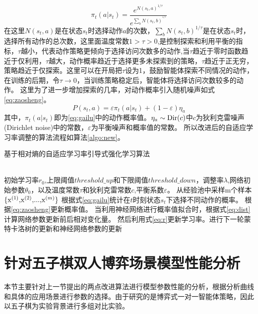 \begin{equation}
\label{eq:gailu}
{\pi _t}(a|{s_t}) = \frac{{{e^{N{{({s_t},a)}^{1/\tau }}}}}}{{{e^{\sum\nolimits_b {N{{({s_t},b)}^{^{1/\tau }}}} }}}}
\end{equation}
在这里${N({s_t},a)}$是在状态$s_t$时选择动作$a$的次数，${\sum\nolimits_b {N{{({s_t},b)}^{1/\tau }}} }$是在状态$s_t$时，选择所有动作的总次数，这里面温度常数$1>\tau>0$,是控制探索和利用平衡的指标，$\tau$越小，代表动作策略更倾向于选择访问次数多的动作,当$\tau$趋近于零时函数趋近于仅利用，$\tau$越大，动作概率趋近于选择更多未探索到的策略，$\tau$趋近于正无穷，策略趋近于仅探索。这里可以在开局把$\tau$设为1，鼓励智能体探索不同情况的动作，在训练的后期，令$\tau  \to 0$，当训练策略稳定后，智能体将选择访问次数较多的动作。
这里为了进一步增加探索的几率，对动作概率引入随机噪声如式\ref{eq:zaosheng}。
\begin{equation}
\label{eq:zaosheng}
	P({s_t},a) = \varepsilon{\pi _t}(a|{s_t}) + (1-\varepsilon) {\eta _a}
\end{equation}
其中，${\pi _t}(a|{s_t})$即为\ref{eq:gailu}中的动作概率值。${\eta _a} \sim {\rm{Dir}}(c)$中$c$为狄利克雷噪声(Dirichlet noise)中的常数，$\varepsilon$为平衡噪声和概率值的常数。
所以改进后的自适应学习率调整的算法流程如算法\ref{algo:new}。
\begin{algorithm}[htpb]
	\caption{基于相对熵的自适应学习率引导式强化学习算法}%
	\label{algo:new}
	\begin{algorithmic}[1]
		\Require ~~ \\
		初始学习率$r_0$,上限阈值$threshold\_up$和下限阈值$threshold\_down$，调整率$\lambda$,网络初始参数$\theta_0$，以及温度常数$\tau$和狄利克雷常数$c$,平衡系数$\varepsilon $。
		\State 从经验池中采样m个样本${\rm{\{ }}{{\rm{x}}^{(1)}}{\rm{,}}{{\rm{x}}^{(2)}}{\rm{,}}...{\rm{,}}{{\rm{x}}^{(m)}}{\rm{\} }}$
		\State 根据式\ref{eq:gailu}统计在$t$时刻状态$s_t$下选择不同动作的概率。
		\State 根据\ref{eq:zaosheng}更新概率值。
		\State 当利用神经网络进行概率值拟合时，根据式\ref{eq:dist}计算网络参数更新前后相对变化量。
		\State 然后利用式\ref{eq:r}更新学习率。进行下一轮蒙特卡洛树的更新和神经网络参数的更新
		\EndWhile
	\end{algorithmic}
\end{algorithm}

\section{针对五子棋双人博弈场景模型性能分析}

本节主要针对上一节提出的两点改进算法进行模型参数性能的分析，根据分析曲线和具体的应用场景进行参数的选择。由于研究的是博弈式一对一智能体策略，因此以五子棋为实验背景进行多组对比实验。

